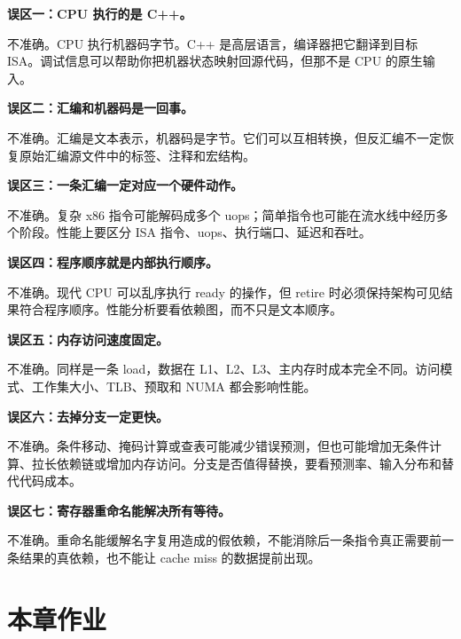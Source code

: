 \begin{warningbox}
\textbf{误区一：CPU 执行的是 C++。}

不准确。CPU 执行机器码字节。C++ 是高层语言，编译器把它翻译到目标 ISA。调试信息可以帮助你把机器状态映射回源代码，但那不是 CPU 的原生输入。
\end{warningbox}

\begin{warningbox}
\textbf{误区二：汇编和机器码是一回事。}

不准确。汇编是文本表示，机器码是字节。它们可以互相转换，但反汇编不一定恢复原始汇编源文件中的标签、注释和宏结构。
\end{warningbox}

\begin{warningbox}
\textbf{误区三：一条汇编一定对应一个硬件动作。}

不准确。复杂 x86 指令可能解码成多个 uops；简单指令也可能在流水线中经历多个阶段。性能上要区分 ISA 指令、uops、执行端口、延迟和吞吐。
\end{warningbox}

\begin{warningbox}
\textbf{误区四：程序顺序就是内部执行顺序。}

不准确。现代 CPU 可以乱序执行 ready 的操作，但 retire 时必须保持架构可见结果符合程序顺序。性能分析要看依赖图，而不只是文本顺序。
\end{warningbox}

\begin{warningbox}
\textbf{误区五：内存访问速度固定。}

不准确。同样是一条 load，数据在 L1、L2、L3、主内存时成本完全不同。访问模式、工作集大小、TLB、预取和 NUMA 都会影响性能。
\end{warningbox}

\begin{warningbox}
\textbf{误区六：去掉分支一定更快。}

不准确。条件移动、掩码计算或查表可能减少错误预测，但也可能增加无条件计算、拉长依赖链或增加内存访问。分支是否值得替换，要看预测率、输入分布和替代代码成本。
\end{warningbox}

\begin{warningbox}
\textbf{误区七：寄存器重命名能解决所有等待。}

不准确。重命名能缓解名字复用造成的假依赖，不能消除后一条指令真正需要前一条结果的真依赖，也不能让 cache miss 的数据提前出现。
\end{warningbox}

\section{本章作业}

